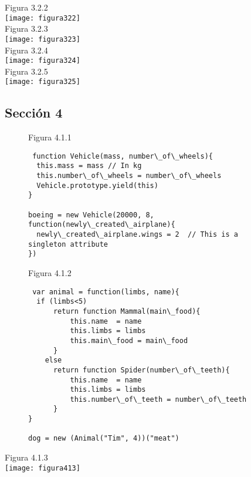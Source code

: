 Figura 3.2.2\\
\texttt{[image: figura322]}\\

Figura 3.2.3\\
\texttt{[image: figura323]}\\

Figura 3.2.4\\
\texttt{[image: figura324]}\\

Figura 3.2.5\\
\texttt{[image: figura325]}

\pagebreak
\subsection{Sección 4}
\label{subsubsection:seccion4}

\begin{figure}
Figura 4.1.1
\begin{verbatim}
 function Vehicle(mass, number\_of\_wheels){
  this.mass = mass // In kg 
  this.number\_of\_wheels = number\_of\_wheels
  Vehicle.prototype.yield(this)
}

boeing = new Vehicle(20000, 8, function(newly\_created\_airplane){
  newly\_created\_airplane.wings = 2  // This is a singleton attribute
})
\end{verbatim}
\end{figure}


\begin{figure}
Figura 4.1.2
\begin{verbatim}
 var animal = function(limbs, name){
  if (limbs<5)
      return function Mammal(main\_food){
          this.name  = name
          this.limbs = limbs
          this.main\_food = main\_food
      }
    else
      return function Spider(number\_of\_teeth){
          this.name  = name
          this.limbs = limbs
          this.number\_of\_teeth = number\_of\_teeth
      }
}

dog = new (Animal("Tim", 4))("meat")
\end{verbatim}
\end{figure}


Figura 4.1.3\\
\texttt{[image: figura413]}\\


